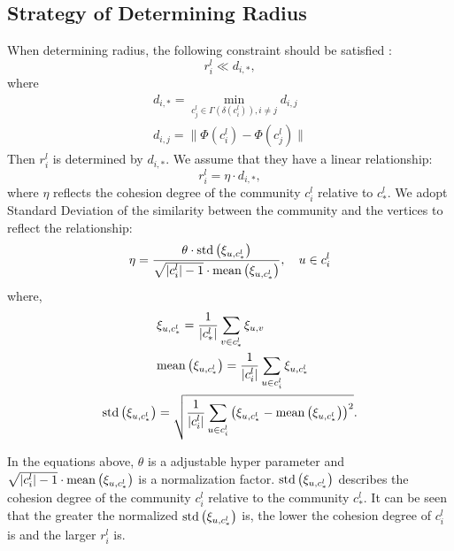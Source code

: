 \documentclass{article}
\theoremstyle{definition}
\begin{document}
	 \subsection{Strategy of Determining Radius}
	 When determining radius, the following constraint should be satisfied : 
	 \begin{equation}
	 	r^l_i \ll  d_{i,*},
	 \end{equation}
	 where 
	 \begin{align}
	 	d_{i,*} = \min_{c^l_j \in \Gamma(\delta(c^l_i)), i \neq j} d_{i,j}\\
	 	d_{i, j} = \lVert\Phi(c_i^{l}) - \Phi(c_j^{l})\rVert
	 \end{align}
	 Then $r_i^l$ is determined by $d_{i,*}$. We assume that they have a linear relationship: 
	 \begin{equation}
	 	r_i^l = \eta \cdot d_{i, *},
	 \end{equation} 
	 where $\eta$ reflects the cohesion degree of the community $c_i^l$ relative to $c_*^l$. We adopt Standard Deviation of the similarity between the community and the vertices to reflect the relationship:
	 \begin{equation}
	 	\eta = \frac{\theta \cdot {\rm std}\left(\xi_{u, c_*^l}\right)}{\sqrt{|c_i^l| - 1} \cdot {\rm mean}\left(\xi_{u, c_*^l}\right)}, \quad u \in c_i^l
	 \end{equation}
	 where,
	 \[
	 \begin{split}
	 	& \xi_{u, c_*^l} = \frac{1}{|c_*^l|}\sum_{v \in c_*^l}\xi_{u,v} \\
	 	& {\rm mean}\left(\xi_{u, c_*^l}\right) = \frac{1}{|c_i^l|}\sum_{u \in c_i^l}\xi_{u,c_*^l} \\
	 	{\rm std}\left(\xi_{u, c_*^l}\right) & = \sqrt{\frac{1}{|c_i^l|}\sum_{u \in c_i^l}\left(\xi_{u,c_*^l} - {\rm mean}\left(\xi_{u, c_*^l}\right)\right)^2}.
	 \end{split}
	 \]
	 
	 In the equations above, $\theta$ is a adjustable hyper parameter and $\sqrt{|c_i^l| - 1} \cdot {\rm mean}\left(\xi_{u, c_*^l}\right)$ is a normalization factor. ${\rm std}\left(\xi_{u, c_*^l}\right)$ describes the cohesion degree of the community $c_i^l$ relative to the community $c_*^l$. It can be seen that the greater the normalized ${\rm std}\left(\xi_{u, c_*^l}\right)$ is, the lower the cohesion degree of $c_i^l$ is and the larger $r_i^l$ is. 
\end{document}
